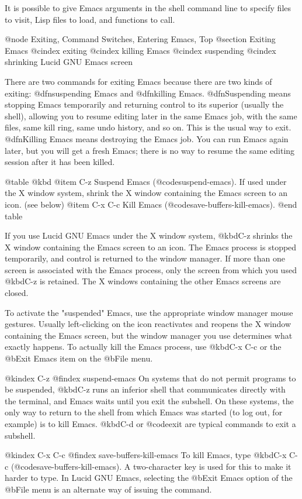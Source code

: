 {{  It is possible to give Emacs arguments in the shell command line to
specify files to visit, Lisp files to load, and functions to call.

@node Exiting, Command Switches, Entering Emacs, Top
@section Exiting Emacs
@cindex exiting
@cindex killing Emacs
@cindex suspending
@cindex shrinking Lucid GNU Emacs screen

  There are two commands for exiting Emacs because there are two kinds
of exiting: @dfn{suspending} Emacs and @dfn{killing} Emacs.
@dfn{Suspending} means stopping Emacs temporarily and returning control
to its superior (usually the shell), allowing you to resume editing
later in the same Emacs job, with the same files, same kill ring, same
undo history, and so on.  This is the usual way to exit.  @dfn{Killing}
Emacs means destroying the Emacs job.  You can run Emacs again later,
but you will get a fresh Emacs; there is no way to resume the same
editing session after it has been killed.

@table @kbd
@item C-z
Suspend Emacs (@code{suspend-emacs}).  If used under the X window system,
shrink the X window containing the Emacs screen to an icon.  (see below)
@item C-x C-c
Kill Emacs (@code{save-buffers-kill-emacs}).
@end table

If you use Lucid GNU Emacs under the X window system, @kbd{C-z} shrinks
the X window containing the Emacs screen to an icon.  The Emacs process
is stopped temporarily, and control is returned to the window manager.
If more than one screen is associated with the Emacs process, only the
screen from which you used @kbd{C-z} is retained.  The X windows
containing the other Emacs screens are closed. 

To activate the "suspended" Emacs, use the appropriate window manager
mouse gestures.  Usually left-clicking on the icon reactivates and
reopens the X window containing the Emacs screen, but the window manager
you use determines what exactly happens.  To actually kill the Emacs
process, use @kbd{C-x C-c} or the @b{Exit Emacs} item on the @b{File}
menu.

@kindex C-z
@findex suspend-emacs
  On systems that do not permit programs to be suspended, @kbd{C-z} runs
an inferior shell that communicates directly with the terminal, and
Emacs waits until you exit the subshell.  On these systems, the only way
to return to the shell from which Emacs was started (to log out, for
example) is to kill Emacs.  @kbd{C-d} or @code{exit} are typical
commands to exit a subshell.

@kindex C-x C-c
@findex save-buffers-kill-emacs
  To kill Emacs, type @kbd{C-x C-c} (@code{save-buffers-kill-emacs}).  A
two-character key is used for this to make it harder to type.  In Lucid
GNU Emacs, selecting the @b{Exit Emacs} option of the @b{File} menu is an
alternate way of issuing the command.

}}
